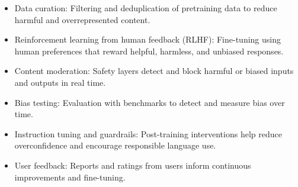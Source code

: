 \documentclass{article}
\begin{document}

\begin{itemize}
    \item Data curation: Filtering and deduplication of pretraining data to reduce harmful and overrepresented content.
    \item Reinforcement learning from human feedback (RLHF): Fine-tuning using human preferences that reward helpful, harmless, and unbiased responses.
    \item Content moderation: Safety layers detect and block harmful or biased inputs and outputs in real time.
    \item Bias testing: Evaluation with benchmarks to detect and measure bias over time.
    \item Instruction tuning and guardrails: Post-training interventions help reduce overconfidence and encourage responsible language use.
    \item User feedback: Reports and ratings from users inform continuous improvements and fine-tuning.
\end{itemize}
\end{document}
